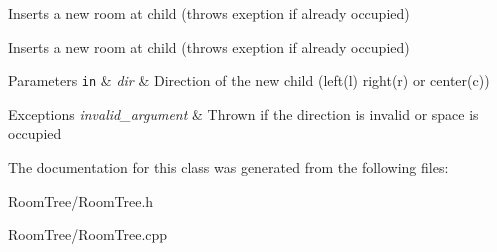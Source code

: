 Inserts a new room at child (throws exeption if already occupied) 

Inserts a new room at child (throws exeption if already occupied) 
\begin{DoxyParams}[1]{Parameters}
\mbox{\tt in}  & {\em dir} & Direction of the new child (left(l) right(r) or center(c)) \\
\hline
\end{DoxyParams}

\begin{DoxyExceptions}{Exceptions}
{\em invalid\-\_\-argument} & Thrown if the direction is invalid or space is occupied \\
\hline
\end{DoxyExceptions}


The documentation for this class was generated from the following files\-:\begin{DoxyCompactItemize}
\item 
Room\-Tree/Room\-Tree.\-h\item 
Room\-Tree/Room\-Tree.\-cpp\end{DoxyCompactItemize}
